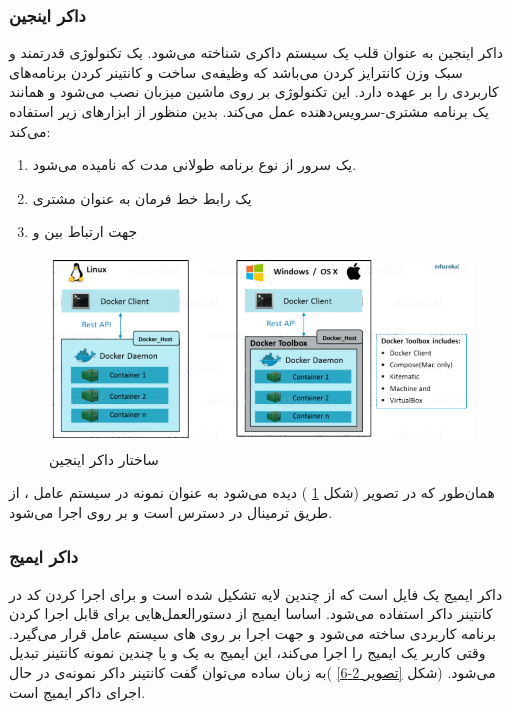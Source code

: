\subsubsection*{داکر اینجین}
داکر اینجین به عنوان قلب یک سیستم داکری شناخته می‌شود. یک تکنولوژی قدرتمند و سبک وزن کانترایز کردن  می‌باشد که وظیفه‌ی ساخت و کانتینر کردن برنامه‌های کاربردی را بر عهده دارد. این تکنولوژی بر روی ماشین میزبان نصب می‌شود و همانند یک برنامه مشتری-سرویس‌دهنده عمل می‌کند. بدین منظور از ابزارهای زیر استفاده می‌کند:
\begin{enumerate}
	\item 
	یک سرور از نوع برنامه طولانی مدت  که
	نامیده می‌شود.
	\item 
	یک رابط خط فرمان به عنوان مشتری
	
	\item 
	جهت ارتباط بین
	و
	
\end{enumerate}

\begin{figure}[!h]
	\centering
	\includegraphics[height=5cm]{fig2-5}
	\caption{ساختار داکر اینجین}
	\label{تصویر 2-5}
\end{figure}

همان‌طور که در تصویر (شکل 
\ref{تصویر 2-5}
) دیده می‌شود به عنوان نمونه در سیستم عامل
،
از طریق ترمینال در دسترس است و
بر روی
اجرا می‌شود. 


\subsubsection*{داکر ایمیج}
داکر ایمیج  یک فایل است که از چندین لایه تشکیل شده است و برای اجرا کردن کد در کانتینر داکر استفاده می‌شود. اساسا ایمیج از دستورالعمل‌هایی برای قابل اجرا کردن برنامه کاربردی ساخته می‌شود و جهت اجرا بر روی 
های سیستم عامل قرار می‌گیرد. وقتی کاربر یک ایمیج را اجرا می‌کند، این ایمیج به یک و یا چندین نمونه کانتینر تبدیل می‌شود. (شکل
\ref{تصویر 2-6}
)به زبان ساده می‌توان گفت کانتینر داکر نمونه‌ی در حال اجرای داکر ایمیج است.

